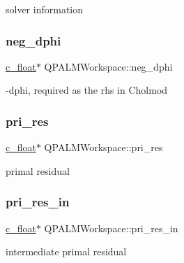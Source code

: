 solver information 

\mbox{\label{structQPALMWorkspace_a771d4ed92094edc40f650ed185178acd}} 
\subsubsection{\texorpdfstring{neg\_dphi}{neg\_dphi}}
{\footnotesize\ttfamily \mbox{\hyperlink{global__opts_8h_a7f1a9fda95e52979658c20a0d134fb15}{c\+\_\+float}}$\ast$ Q\+P\+A\+L\+M\+Workspace\+::neg\+\_\+dphi}



-\/dphi, required as the rhs in Cholmod 

\mbox{\label{structQPALMWorkspace_a46bd3912583b69f83d5bd3cbb2bee8b2}} 
\subsubsection{\texorpdfstring{pri\_res}{pri\_res}}
{\footnotesize\ttfamily \mbox{\hyperlink{global__opts_8h_a7f1a9fda95e52979658c20a0d134fb15}{c\+\_\+float}}$\ast$ Q\+P\+A\+L\+M\+Workspace\+::pri\+\_\+res}



primal residual 

\mbox{\label{structQPALMWorkspace_a4178a4d2bfdb85f18f14e3ddfaec142c}} 
\subsubsection{\texorpdfstring{pri\_res\_in}{pri\_res\_in}}
{\footnotesize\ttfamily \mbox{\hyperlink{global__opts_8h_a7f1a9fda95e52979658c20a0d134fb15}{c\+\_\+float}}$\ast$ Q\+P\+A\+L\+M\+Workspace\+::pri\+\_\+res\+\_\+in}



intermediate primal residual 

\mbox{\label{structQPALMWorkspace_af3614a39bf75c0331f89447caa3d1217}} 
